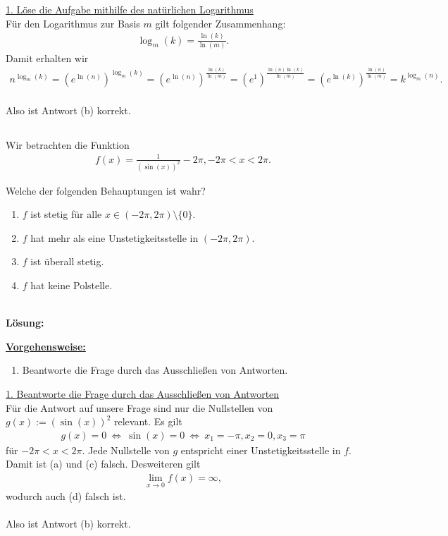 \underline{1. Löse die Aufgabe mithilfe des natürlichen Logarithmus}\\
Für den Logarithmus zur Basis $m  $ gilt folgender Zusammenhang:
\begin{align*}
\log_m(k) = \frac{\ln (k)}{\ln(m)}.
\end{align*}
Damit erhalten wir 
\begin{align*}
n^{\log_m(k)} 
=
\left(e^{\ln(n)}\right)^{\log_m(k)}
=
\left(e^{\ln(n)}\right)^{\frac{\ln (k)}{\ln(m)}}
=
\left(e^{1}\right)^{\frac{\ln(n) \ln (k)}{\ln(m)}}
=
\left(e^{\ln (k)}\right)^{\frac{\ln(n) }{\ln(m)}}
=k^{\log_m(n)}.
\end{align*}
\ \\
Also ist Antwort (b) korrekt.
\newpage

\subsection*{}
Wir betrachten die Funktion
\begin{align*}
f(x) = \frac{1}{(\sin(x))^2}- 2 \pi, -2 \pi < x < 2 \pi.
\end{align*}

Welche der folgenden Behauptungen ist wahr?
\renewcommand{\labelenumi}{(\alph{enumi})}
\begin{enumerate}
	\item 
	$ f $ ist stetig für alle $ x \in (-2 \pi, 2 \pi) \setminus \lbrace 0 \rbrace $.
	\item
	$ f $ hat mehr als eine Unstetigkeitsstelle in $ (- 2 \pi , 2 \pi ) $.
	
	\item
	$ f $ ist überall stetig.
	\item
	$ f $ hat keine Polstelle.
\end{enumerate}
\ \\
\textbf{Lösung:}
\begin{mdframed}
\underline{\textbf{Vorgehensweise:}}
\renewcommand{\labelenumi}{\theenumi.}
\begin{enumerate}
\item Beantworte die Frage durch das Ausschließen von Antworten.
\end{enumerate}
\end{mdframed}

\underline{1. Beantworte die Frage durch das Ausschließen von Antworten}\\
Für die Antwort auf unsere Frage sind nur die Nullstellen von $ g(x) := (\sin(x))^2 $ relevant. Es gilt 
\begin{align*}
g(x) = 0 \ \Leftrightarrow \ 
\sin(x) = 0 
\ \Leftrightarrow \
x_1 = - \pi , x_2 = 0 , x_3 = \pi
\end{align*}
für $ -2 \pi < x < 2 \pi $.
Jede Nullstelle von $ g $ entspricht einer Unstetigkeitsstelle in $ f $. Damit ist (a) und (c) falsch.
Desweiteren gilt
\begin{align*}
\lim \limits_{x \to 0 }  f(x) = \infty,
\end{align*}
wodurch auch (d) falsch ist.\\
\\
Also ist Antwort (b) korrekt.


